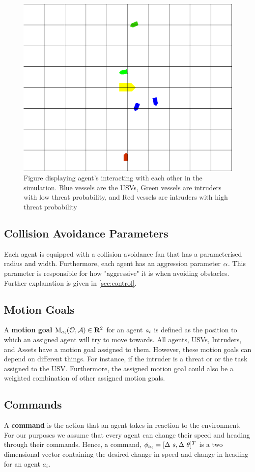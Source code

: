 \documentclass[bsc,frontabs,twoside,singlespacing,parskip,deptreport]{infthesis}     %
\begin{document}
\begin{figure}
    \centering
    \includegraphics[width=0.8\linewidth]{report/images/agents.png}
    \caption{Figure displaying agent's interacting with each other in the simulation. Blue vessels are the USVs, Green vessels are intruders with low threat probability, and Red vessels are intruders with high threat probability}
    \label{fig:agents}
\end{figure}

\subsection{Collision Avoidance Parameters}
Each agent is equipped with a collision avoidance fan that has a parameterised radius and width. Furthermore, each agent has an aggression parameter $\alpha$. This parameter is responsible for how "aggressive" it is when avoiding obstacles. Further explanation is given in \ref{sec:control}.

\subsection{Motion Goals}
\label{def:mg}
A \textbf{motion goal} $\mathrm{M}_{a_{i}}(\mathcal{O}, \mathcal{A}) \in \mathbf{R}^2$ for an agent $a_{i}$ is defined as the position to which an assigned agent will try to move towards. All agents, USVs, Intruders, and Assets have a motion goal assigned to them. However, these motion goals can depend on different things. For instance, if the intruder is a threat or \nonthreat or the task assigned to the USV. Furthermore, the assigned motion goal could also be a weighted combination of other assigned motion goals. 

\subsection{Commands}
\label{def:command}
A \textbf{command} is the action that an agent takes in reaction to the environment. For our purposes we assume that every agent can change their speed and heading through their commands. Hence, a command, $\phi_{a_i}=[\Delta~s, \Delta~\theta]^T$ is a two dimensional vector containing the desired change in speed and change in heading for an agent $a_i$. 
\end{document}
